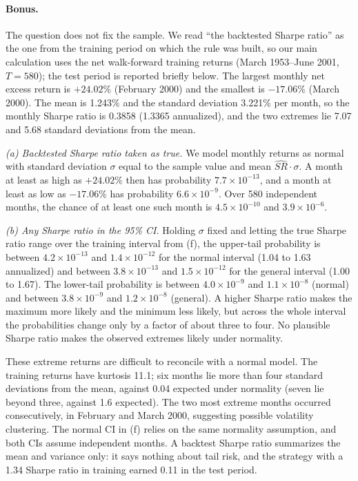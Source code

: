 \paragraph{Bonus.}
The question does not fix the sample. We read ``the backtested Sharpe ratio''
as the one from the training period on which the rule was built, so our main
calculation uses the net walk-forward training returns (March 1953--June 2001,
$T=580$); the test period is reported briefly below. The largest monthly net
excess return is $+24.02\%$ (February 2000) and the smallest is $-17.06\%$
(March 2000). The mean is 1.243\% and the standard deviation 3.221\% per month,
so the monthly Sharpe ratio is 0.3858 (1.3365 annualized), and the two extremes
lie 7.07 and 5.68 standard deviations from the mean.

\emph{(a) Backtested Sharpe ratio taken as true.} We model monthly returns as
normal with standard deviation $\sigma$ equal to the sample value and mean
$\widehat{SR}\cdot\sigma$. A month at least as high as $+24.02\%$ then has
probability $7.7\times10^{-13}$, and a month at least as low as $-17.06\%$ has
probability $6.6\times10^{-9}$. Over 580 independent months, the chance of at
least one such month is $4.5\times10^{-10}$ and $3.9\times10^{-6}$.

\emph{(b) Any Sharpe ratio in the 95\% CI.} Holding $\sigma$ fixed and letting
the true Sharpe ratio range over the training interval from (f), the
upper-tail probability is between $4.2\times10^{-13}$ and $1.4\times10^{-12}$
for the normal interval (1.04 to 1.63 annualized) and between
$3.8\times10^{-13}$ and $1.5\times10^{-12}$ for the general interval (1.00 to
1.67). The lower-tail probability is between $4.0\times10^{-9}$ and
$1.1\times10^{-8}$ (normal) and between $3.8\times10^{-9}$ and
$1.2\times10^{-8}$ (general). A higher Sharpe ratio makes the maximum more
likely and the minimum less likely, but across the whole interval the
probabilities change only by a factor of about three to four. No plausible Sharpe ratio
makes the observed extremes likely under normality.

These extreme returns are difficult to reconcile with a normal model. The training
returns have kurtosis 11.1; six months lie more than four standard deviations
from the mean, against 0.04 expected under normality (seven lie beyond three,
against 1.6 expected). The two most extreme months occurred consecutively,
in February and March 2000, suggesting possible volatility clustering. The normal CI in (f) relies on the
same normality assumption, and both CIs assume independent months. A backtest
Sharpe ratio summarizes the mean and variance only: it says nothing about tail
risk, and the strategy with a 1.34 Sharpe ratio in training earned 0.11 in
the test period.

